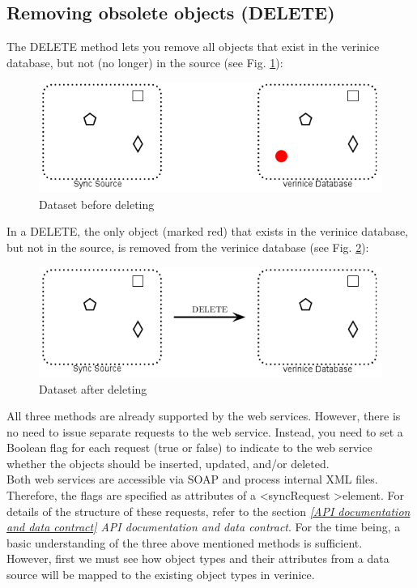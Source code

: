 \documentclass[a4paper,10pt]{book}
\begin{document}
\subsection{Removing obsolete objects (DELETE)}
The DELETE method lets you remove all objects that exist in the verinice database, but not (no longer) in the source (see Fig. \ref{Dataset before deleting}):
\newline
\begin{figure}[htb!]
  \centering
  \includegraphics[scale=.5]{Screenshot/SyncAPI_pre_DELETE-en.png}
  \caption{\label{Dataset before deleting} Dataset before deleting}
\end{figure}
\newline
In a \textsc{DELETE}, the only object (marked red) that exists in the verinice database, but not in the source,
is removed from the verinice database (see Fig. \ref{Dataset after deleting}):
\newline
\begin{figure}[htb!]
  \centering
  \includegraphics[scale=.51]{Screenshot/SyncAPI_post_DELETE-en.png}
  \caption{\label{Dataset after deleting} Dataset after deleting}
\end{figure}
\newline
All three methods are already supported by the web services. However, there is no need to issue separate
requests to the web service. Instead, you need to set a Boolean flag for each request (true or false) to
indicate to the web service whether the objects should be inserted, updated, and/or deleted.
\newline\\
Both web services are accessible via SOAP and process internal XML files. Therefore, the flags are specified as attributes of a
\textless syncRequest \textgreater element. For details of the structure of these requests, refer to the section
{\em\ref{API documentation and data contract} API documentation and data contract}. For the time being, a basic
understanding of the three above mentioned methods is sufficient.
\newline\\
However, first we must see how object types and their attributes from a data source will be mapped to the existing
object types in verinice.
\end{document}
